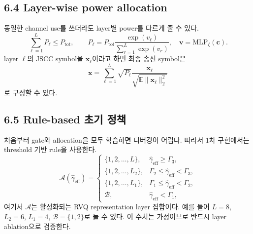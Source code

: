 \documentclass[11pt,a4paper]{article}
\begin{document}
\subsection{6.4 Layer-wise power allocation}
동일한 channel use를 쓰더라도 layer별 power를 다르게 줄 수 있다.
\begin{equation}
    \sum_{\ell=1}^{L}P_{\ell}\le P_{\mathrm{tot}}, \qquad
    P_{\ell}=P_{\mathrm{tot}}\frac{\exp(v_{\ell})}{\sum_{r=1}^{L}\exp(v_r)}, \quad \bm{v}=\mathrm{MLP}_{\zeta}(\bm{c}).
\end{equation}
layer $\ell$의 JSCC symbol을 $\bm{x}_{\ell}$이라고 하면 최종 송신 symbol은
\begin{equation}
    \bm{x}=\sum_{\ell=1}^{L}\sqrt{P_{\ell}}\frac{\bm{x}_{\ell}}{\sqrt{\mathbb{E}\|\bm{x}_{\ell}\|_2^2}}
\end{equation}
로 구성할 수 있다.

\subsection{6.5 Rule-based 초기 정책}
처음부터 gate와 allocation을 모두 학습하면 디버깅이 어렵다. 따라서 1차 구현에서는 threshold 기반 rule을 사용한다.
\begin{equation}
\mathcal{A}(\hat{\gamma}_{\mathrm{eff}})=
\begin{cases}
\{1,2,\ldots,L\}, & \hat{\gamma}_{\mathrm{eff}}\ge \Gamma_3,\\
\{1,2,\ldots,L_2\}, & \Gamma_2\le \hat{\gamma}_{\mathrm{eff}}<\Gamma_3,\\
\{1,2,\ldots,L_1\}, & \Gamma_1\le \hat{\gamma}_{\mathrm{eff}}<\Gamma_2,\\
\mathcal{B}, & \hat{\gamma}_{\mathrm{eff}}<\Gamma_1,
\end{cases}
\end{equation}
여기서 $\mathcal{A}$는 활성화되는 RVQ representation layer 집합이다. 예를 들어 $L=8$, $L_2=6$, $L_1=4$, $\mathcal{B}=\{1,2\}$로 둘 수 있다. 이 수치는 가정이므로 반드시 layer ablation으로 검증한다.
\end{document}

